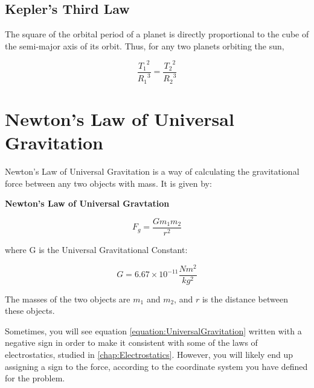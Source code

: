 		
		
	\subsection{Kepler's Third Law}
			The square of the orbital period of a planet is directly proportional to the cube of the semi-major axis of its orbit. Thus, for any two planets orbiting the sun, 
			
					\begin{mdframed}[backgroundcolor=orange!20!white]
						\begin{equation}
			\frac{{T_1}^2}{{R_1}^3} = \frac{{T_2}^2}{{R_2}^3}
			\label{equation:kep3rd}
			\end{equation}
		\end{mdframed}
	
	
	
	
	\section{Newton's Law of Universal Gravitation} 
	
	Newton's Law of Universal Gravitation is a way of calculating the gravitational force between any two objects with mass.  It is given by: 
	\begin{mdframed}[backgroundcolor=orange!20!white]
		\begin{center}
\textbf{Newton's Law of Universal Gravtation}
		\end{center}
		\begin{equation}
		F_g = \frac{G m_1m_2}{r^2}
		\label{equation:UniversalGravitation}
		\end{equation}
	\end{mdframed}
	where G is the Universal Gravitational Constant:
	
		\begin{mdframed}[backgroundcolor=green!20!white]
		\begin{equation*}
		G = 6.67 \times 10^{-11} \si{\frac{Nm^2}{kg^2}}
		\label{equation:universalgravconstant}
		\end{equation*}
	\end{mdframed}	
	
	 
	 
	 The masses of the two objects are $m_1$ and $m_2$, and $r$ is the distance between these objects.   
	
	
	Sometimes, you will see equation \ref{equation:UniversalGravitation} written with a negative sign in order to make it consistent with some of the laws of electrostatics, studied in \autoref{chap:Electrostatics}. However, you will likely end up assigning a sign to the force, according to the coordinate system you have defined for the problem. 
	
